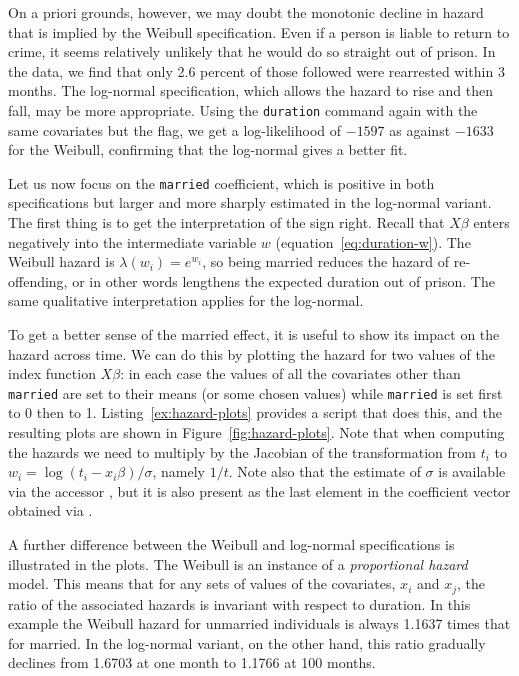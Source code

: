 On a priori grounds, however, we may doubt the monotonic decline in
hazard that is implied by the Weibull specification. Even if a person
is liable to return to crime, it seems relatively unlikely that he
would do so straight out of prison. In the data, we find that only 2.6
percent of those followed were rearrested within 3 months. The
log-normal specification, which allows the hazard to rise and then
fall, may be more appropriate.  Using the \texttt{duration} command
again with the same covariates but the  flag, we get
a log-likelihood of $-1597$ as against $-1633$ for the Weibull,
confirming that the log-normal gives a better fit.

Let us now focus on the \texttt{married} coefficient, which is
positive in both specifications but larger and more sharply estimated
in the log-normal variant. The first thing is to get the
interpretation of the sign right.  Recall that $X\beta$ enters
negatively into the intermediate variable $w$
(equation~\ref{eq:duration-w}). The Weibull hazard is
$\lambda(w_i) = e^{w_i}$, so being married reduces the hazard of
re-offending, or in other words lengthens the expected duration out of
prison.  The same qualitative interpretation applies for the
log-normal.

To get a better sense of the married effect, it is useful to show its
impact on the hazard across time. We can do this by plotting the
hazard for two values of the index function $X\beta$: in each case the
values of all the covariates other than \texttt{married} are set to
their means (or some chosen values) while \texttt{married} is set
first to 0 then to 1. Listing~\ref{ex:hazard-plots} provides a script
that does this, and the resulting plots are shown in
Figure~\ref{fig:hazard-plots}. Note that when computing the hazards we
need to multiply by the Jacobian of the transformation from $t_i$ to
$w_i = \log (t_i - x_i\beta)/\sigma$, namely $1/t$.  Note also that
the estimate of $\sigma$ is available via the accessor ,
but it is also present as the last element in the coefficient vector
obtained via .

A further difference between the Weibull and log-normal specifications
is illustrated in the plots. The Weibull is an instance of a
\emph{proportional hazard} model. This means that for any sets of
values of the covariates, $x_i$ and $x_j$, the ratio of the associated
hazards is invariant with respect to duration. In this example the
Weibull hazard for unmarried individuals is always 1.1637 times that
for married. In the log-normal variant, on the other hand, this ratio
gradually declines from 1.6703 at one month to 1.1766 at 100 months.


